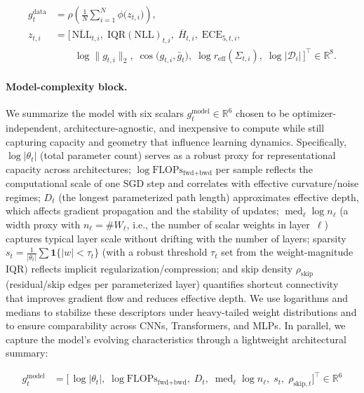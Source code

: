 \documentclass[11pt]{article}
\newcommand{\1}{\mathbf{1}}
\begin{document}
\begin{equation}
\label{eq:gdata-full}
\begin{aligned}
g^{\text{data}}_t
&= \rho\!\left(\frac{1}{N}\sum_{i=1}^N \phi\!\big(z_{t,i}\big)\right),\\[0.25em]
z_{t,i}
&= \Big[\, \overline{\mathrm{NLL}}_{t,i},\; \mathrm{IQR}(\mathrm{NLL})_{t,i},\; \overline{H}_{t,i},\; \mathrm{ECE}_{5,t,i},\\[-0.25em]
&\qquad \log\|g_{t,i}\|_2,\; \cos\!\big(g_{t,i},\bar g_t\big),\; \log r_{\mathrm{eff}}(\Sigma_{t,i}),\; \log|\mathcal D_i| \,\Big]^{\!\top}\!\in\mathbb{R}^{8}.
\end{aligned}
\end{equation}

\paragraph{Model-complexity block.}
We summarize the model with six scalars $g^{\text{model}}_t\in\mathbb{R}^{6}$ chosen to be optimizer-independent, architecture-agnostic, and inexpensive to compute while still capturing capacity and geometry that influence learning dynamics. Specifically, $\log\lvert\theta_t\rvert$ (total parameter count) serves as a robust proxy for representational capacity across architectures; $\log\mathrm{FLOPs}_{\text{fwd+bwd}}$ per sample reflects the computational scale of one SGD step and correlates with effective curvature/noise regimes; $D_t$ (the longest parameterized path length) approximates effective depth, which affects gradient propagation and the stability of updates; $\operatorname{med}_\ell \log n_\ell$ (a width proxy with $n_\ell=\#W_\ell$, i.e., the number of scalar weights in layer~$\ell$) captures typical layer scale without drifting with the number of layers; sparsity $s_t=\frac{1}{\lvert\theta_t\rvert}\sum \mathbf{1}\{\lvert w\rvert<\tau_t\}$ (with a robust threshold $\tau_t$ set from the weight-magnitude $\mathrm{IQR})$ reflects implicit regularization/compression; and skip density $\rho_{\text{skip}}$ (residual/skip edges per parameterized layer) quantifies shortcut connectivity that improves gradient flow and reduces effective depth. We use logarithms and medians to stabilize these descriptors under heavy-tailed weight distributions and to ensure comparability across CNNs, Transformers, and MLPs. In parallel, we capture the model’s evolving characteristics through a lightweight architectural summary:

\begin{equation}
\label{eq:gmodel-full}
\begin{aligned}
g^{\text{model}}_t
&= \Big[\,
\log|\theta_t|,\;
\log \mathrm{FLOPs}_{\text{fwd+bwd}},\;
D_t,\;
\operatorname{med}_\ell \log n_\ell,\;
s_t,\;
\rho_{\text{skip},t}
\Big]^{\!\top}\!\in\mathbb{R}^{6}
\end{aligned}
\end{equation}
\end{document}
